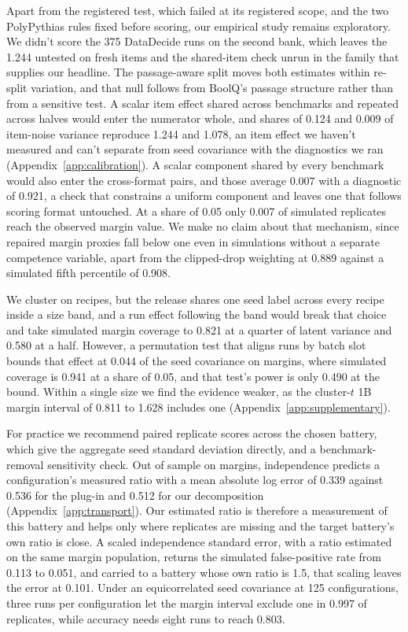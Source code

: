 Apart from the registered test, which failed at its registered scope, and the two PolyPythias rules fixed before scoring, our empirical study remains exploratory. We didn't score the 375 DataDecide runs on the second bank, which leaves the 1.244 untested on fresh items and the shared-item check unrun in the family that supplies our headline. The passage-aware split moves both estimates within re-split variation, and that null follows from BoolQ's passage structure rather than from a sensitive test. A scalar item effect shared across benchmarks and repeated across halves would enter the numerator whole, and shares of 0.124 and 0.009 of item-noise variance reproduce 1.244 and 1.078, an item effect we haven't measured and can't separate from seed covariance with the diagnostics we ran (Appendix~\ref{app:calibration}). A scalar component shared by every benchmark would also enter the cross-format pairs, and those average 0.007 with a diagnostic of 0.921, a check that constrains a uniform component and leaves one that follows scoring format untouched. At a share of 0.05 only 0.007 of simulated replicates reach the observed margin value. We make no claim about that mechanism, since repaired margin proxies fall below one even in simulations without a separate competence variable, apart from the clipped-drop weighting at 0.889 against a simulated fifth percentile of 0.908.

We cluster on recipes, but the release shares one seed label across every recipe inside a size band, and a run effect following the band would break that choice and take simulated margin coverage to 0.821 at a quarter of latent variance and 0.580 at a half. However, a permutation test that aligns runs by batch slot bounds that effect at 0.044 of the seed covariance on margins, where simulated coverage is 0.941 at a share of 0.05, and that test's power is only 0.490 at the bound. Within a single size we find the evidence weaker, as the cluster-$t$ 1B margin interval of 0.811 to 1.628 includes one (Appendix~\ref{app:supplementary}).

For practice we recommend paired replicate scores across the chosen battery, which give the aggregate seed standard deviation directly, and a benchmark-removal sensitivity check. Out of sample on margins, independence predicts a configuration's measured ratio with a mean absolute log error of 0.339 against 0.536 for the plug-in and 0.512 for our decomposition (Appendix~\ref{app:transport}). Our estimated ratio is therefore a measurement of this battery and helps only where replicates are missing and the target battery's own ratio is close. A scaled independence standard error, with a ratio estimated on the same margin population, returns the simulated false-positive rate from 0.113 to 0.051, and carried to a battery whose own ratio is 1.5, that scaling leaves the error at 0.101. Under an equicorrelated seed covariance at 125 configurations, three runs per configuration let the margin interval exclude one in 0.997 of replicates, while accuracy needs eight runs to reach 0.803.

